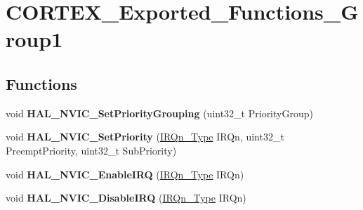 \hypertarget{group___c_o_r_t_e_x___exported___functions___group1}{}\section{C\+O\+R\+T\+E\+X\+\_\+\+Exported\+\_\+\+Functions\+\_\+\+Group1}
\label{group___c_o_r_t_e_x___exported___functions___group1}
\subsection*{Functions}
\begin{DoxyCompactItemize}
\item 
void {\bfseries H\+A\+L\+\_\+\+N\+V\+I\+C\+\_\+\+Set\+Priority\+Grouping} (uint32\+\_\+t Priority\+Group)\hypertarget{group___c_o_r_t_e_x___exported___functions___group1_gad9be53e08b1498adea006e5e037f238f}{}\label{group___c_o_r_t_e_x___exported___functions___group1_gad9be53e08b1498adea006e5e037f238f}

\item 
void {\bfseries H\+A\+L\+\_\+\+N\+V\+I\+C\+\_\+\+Set\+Priority} (\hyperlink{group___peripheral__interrupt__number__definition_ga7e1129cd8a196f4284d41db3e82ad5c8}{I\+R\+Qn\+\_\+\+Type} I\+R\+Qn, uint32\+\_\+t Preempt\+Priority, uint32\+\_\+t Sub\+Priority)\hypertarget{group___c_o_r_t_e_x___exported___functions___group1_ga8581a82025a4780efd00876a66e3e91b}{}\label{group___c_o_r_t_e_x___exported___functions___group1_ga8581a82025a4780efd00876a66e3e91b}

\item 
void {\bfseries H\+A\+L\+\_\+\+N\+V\+I\+C\+\_\+\+Enable\+I\+RQ} (\hyperlink{group___peripheral__interrupt__number__definition_ga7e1129cd8a196f4284d41db3e82ad5c8}{I\+R\+Qn\+\_\+\+Type} I\+R\+Qn)\hypertarget{group___c_o_r_t_e_x___exported___functions___group1_gaaad4492c1b25e006d69948a15790352a}{}\label{group___c_o_r_t_e_x___exported___functions___group1_gaaad4492c1b25e006d69948a15790352a}

\item 
void {\bfseries H\+A\+L\+\_\+\+N\+V\+I\+C\+\_\+\+Disable\+I\+RQ} (\hyperlink{group___peripheral__interrupt__number__definition_ga7e1129cd8a196f4284d41db3e82ad5c8}{I\+R\+Qn\+\_\+\+Type} I\+R\+Qn)\hypertarget{group___c_o_r_t_e_x___exported___functions___group1_ga50ca6290e068821cb84aa168f3e13967}{}\label{group___c_o_r_t_e_x___exported___functions___group1_ga50ca6290e068821cb84aa168f3e13967}


\end{DoxyCompactItemize}
